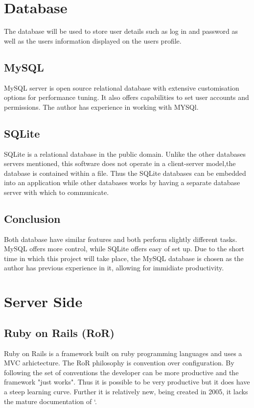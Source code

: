 \documentclass[a4paper,oneside,11pt]{report}
\begin{document}
\section{Database}
The database will be used to store user details such as log in and password as well as the users information displayed on the users profile.
\subsection{MySQL}
MySQL server is open source relational database with extensive customisation options for performance tuning. It also offers capabilities to set user accounts and permissions. The author has experience in working with MYSQl.
\subsection{SQLite}
SQLite is a relational database in the public domain. Unlike the other databases servers mentioned, this software does not operate in a client-server model,the database is contained within a file. Thus the SQLite databases can be embedded into an application while other databases works by having a separate database server with which to communicate.
\subsection{Conclusion}
Both database have similar features and both perform slightly different tasks. MySQL offers more control, while SQLite offers easy of set up. Due to the short time in which this project will take place, the MySQL database is chosen as the author has previous experience in it, allowing for immidiate productivity.

\section{Server Side} 
\subsection{Ruby on Rails (RoR)}  
Ruby on Rails is a framework built on ruby programming languages and uses a MVC arhictecture. The RoR philosophy is convention over configuration. By following the set of conventions the developer can be more productive and the framework "just works". Thus it is possible to be very productive but it does have a steep learning curve. Further it is relatively new, being created in 2005, it lacks the mature documentation of `.
\end{document}

